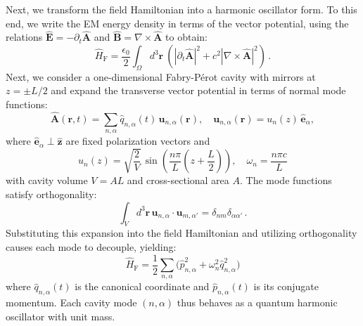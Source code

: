 \documentclass[%
 reprint,
 amsmath,amssymb,
 aps,
]{revtex4-2}
\begin{document}
Next, we transform the field Hamiltonian into a harmonic oscillator form. 
To this end, we write the EM energy density in terms of the vector potential, using the relations $\hat{\bm E} = -\partial_t \hat{\bm A}$ and $\hat{\bm B} = \nabla \times \hat{\bm A}$ to obtain:
\begin{equation}
\hat{H}_\mathrm{F}  = \frac{\epsilon_0}{2} \int_\Omega d^3 \bm r \ \left(\left|\partial_t \hat{\bm A} \right|^2
+ c^2 |\nabla \times \hat{\bm A}|^2 \right) \,.
\end{equation}
Next, we consider a one-dimensional Fabry-Pérot cavity with mirrors at $z=\pm L/2$ and expand the transverse vector potential in terms of normal mode functions:
\begin{equation}
\hat{\bm A}(\bm r,t) = \sum_{n,\alpha} \hat{q}_{n,\alpha}(t)\, \bm u_{n,\alpha}(\bm r),
\quad
\bm u_{n,\alpha}(\bm r)= u_n(z)\,\hat{\bm e}_\alpha,
\end{equation}
where $\hat{\bm e}_\alpha \perp \hat{\bm z}$ are fixed polarization vectors and
\begin{equation}
u_n(z) = \sqrt{\frac{2}{V}}\,\sin \left(\frac{n\pi}{L}\left(z+\frac{L}{2}\right)\right),
\quad \omega_n=\frac{n\pi c}{L}
\end{equation}
with cavity volume $V=A L$ and cross-sectional area $A$.
The mode functions satisfy orthogonality:
\begin{equation}
\int_V d^3\bm r\, \bm u_{n,\alpha} \cdot \bm u_{m,\alpha'} = \delta_{nm}\delta_{\alpha\alpha'} \,.
\end{equation}
Substituting this expansion into the field Hamiltonian and utilizing orthogonality causes each mode to decouple, yielding:
\begin{equation}
\hat{H}_\mathrm{F} = \frac{1}{2} \sum_{n,\alpha} \Big( \hat{p}_{n,\alpha}^2 + \omega_n^2 \hat{q}_{n,\alpha}^2 \Big) \label{eq:HF-sho}
\end{equation}
where $\hat{q}_{n,\alpha}(t)$ is the canonical coordinate and $\hat{p}_{n,\alpha}(t)$ is its conjugate momentum.
Each cavity mode $(n,\alpha)$ thus behaves as a quantum harmonic oscillator with unit mass.
\end{document}
